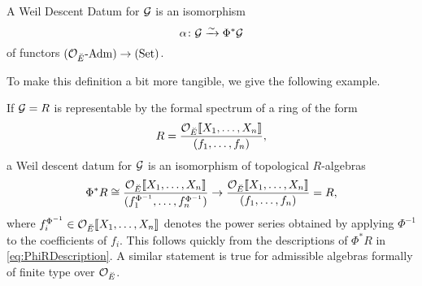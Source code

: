 \documentclass[../main.tex]{subfiles}
\begin{document}
\begin{defi}\label{def:WeilDescentDatum}
  A Weil Descent Datum for $\mathcal{G}$ is an isomorphism
  \begin{equation*}
    \alpha \colon \mathcal{G} \xrightarrow{\sim} \Phi^* \mathcal{G}
  \end{equation*}
  of functors ${({\mathcal{O}_{\breve {E}}}\textnormal-\allowbreak\mathrm{Adm})} \to {(\mathrm{Set})}$.
\end{defi}

To make this definition a bit more tangible, we give the following example.

\begin{xpl}

  If $\mathcal{G} = R$ is representable by the formal spectrum of a ring of the form
  \begin{equation*}
    R = \frac{ \mathcal{O}_{{\breve {E}}}\llbracket X_1, \dots, X_n \rrbracket}{(f_1, \dots,
    f_n)},
  \end{equation*} a Weil descent datum 
  for $\mathcal{G}$ is an isomorphism of topological $R$-algebras
  \begin{equation*}
    \Phi^* R \cong \frac{ \mathcal{O}_{{\breve {E}}} \llbracket X_1, \dots, X_n \rrbracket}{(f_1^{\Phi^{-1}},
    \dots, f_n^{\Phi^{-1}})}
    \to 
    \frac{ \mathcal{O}_{{\breve {E}}}\llbracket X_1, \dots, X_n \rrbracket}{(f_1, \dots,
    f_n)} = R,
  \end{equation*}
  where $f_i^{\Phi^{-1}} \in \mathcal{O}_{\breve {E}}\llbracket X_1, \dots, X_n\rrbracket$ denotes the 
  power series obtained by applying $\Phi^{-1}$ to the coefficients of $f_i$.
  This follows quickly from the descriptions of $\Phi^*R$ in
  \eqref{eq:PhiRDescription}. A similar statement is true for admissible algebras
  formally of finite type over $\mathcal{O}_{\breve {E}}$.
\end{xpl}
\end{document}
